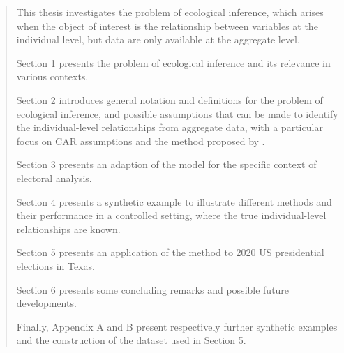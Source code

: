 \thispagestyle{empty}
\newpage
\thispagestyle{empty}
\begin{abstract}

This thesis investigates the problem of ecological inference, which arises when the object of interest is the relationship between variables at the individual level, but data are only available at the aggregate level.

Section 1 presents the problem of ecological inference and its relevance in various contexts.

Section 2 introduces general notation and definitions for the problem of ecological inference, and possible assumptions that can be made to identify the individual-level relationships from aggregate data, with a particular focus on CAR assumptions and the method proposed by \citet{mccartan2025identificationsemiparametricestimationconditional}.

Section 3 presents an adaption of the model for the specific context of electoral analysis.

Section 4 presents a synthetic example to illustrate different methods and their performance in a controlled setting, where the true individual-level relationships are known.

Section 5 presents an application of the method to 2020 US presidential elections in Texas.

Section 6 presents some concluding remarks and possible future developments.

Finally, Appendix A and B present respectively further synthetic examples and the construction of the dataset used in Section 5.

\end{abstract}

\newpage
\tableofcontents

\newpage